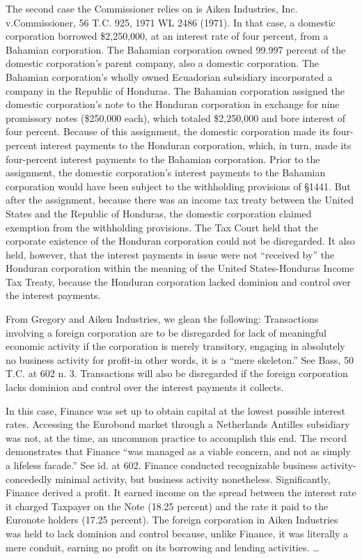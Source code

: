 \begin{select}
The second case the Commissioner relies on is Aiken Industries, Inc. v.\@ Commissioner, 56 T.C. 925, 1971 WL 2486 (1971). In that case, a domestic corporation borrowed \$2,250,000, at an interest rate of four percent, from a Bahamian corporation. The Bahamian corporation owned 99.997 percent of the domestic corporation's parent company, also a domestic corporation. The Bahamian corporation's wholly owned Ecuadorian subsidiary incorporated a company in the Republic of Honduras. The Bahamian corporation assigned the domestic corporation's note to the Honduran corporation in exchange for nine promissory notes (\$250,000 each), which totaled \$2,250,000 and bore interest of four percent. Because of this assignment, the domestic corporation made its four-percent interest payments to the Honduran corporation, which, in turn, made its four-percent interest payments to the Bahamian corporation. Prior to the assignment, the domestic corporation's interest payments to the Bahamian corporation would have been subject to the withholding provisions of \S 1441. But after the assignment, because there was an income tax treaty between the United States and the Republic of Honduras, the domestic corporation claimed exemption from the withholding provisions. The Tax Court held that the corporate existence of the Honduran corporation could not be disregarded. It also held, however, that the interest payments in issue were not ``received by'' the Honduran corporation within the meaning of the United States-Honduras Income Tax Treaty, because the Honduran corporation lacked dominion and control over the interest payments.

From Gregory and Aiken Industries, we glean the following: Transactions involving a foreign corporation are to be disregarded for lack of meaningful economic activity if the corporation is merely transitory, engaging in absolutely no business activity for profit-in other words, it is a ``mere skeleton.'' See Bass, 50 T.C. at 602 n. 3. Transactions will also be disregarded if the foreign corporation lacks dominion and control over the interest payments it collects.

In this case, Finance was set up to obtain capital at the lowest possible interest rates. Accessing the Eurobond market through a Netherlands Antilles subsidiary was not, at the time, an uncommon practice to accomplish this end. The record demonstrates that Finance ``was managed as a viable concern, and not as simply a lifeless facade.'' See id. at 602. Finance conducted recognizable business activity-concededly minimal activity, but business activity nonetheless. Significantly, Finance derived a profit. It earned income on the spread between the interest rate it charged Taxpayer on the Note (18.25 percent) and the rate it paid to the Euronote holders (17.25 percent). The foreign corporation in Aiken Industries was held to lack dominion and control because, unlike Finance, it was literally a mere conduit, earning no profit on its borrowing and lending activities. \ldots


\end{select}

